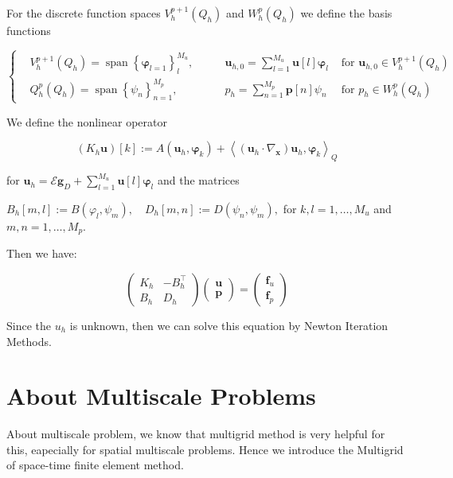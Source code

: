 For the discrete function spaces  $V_{h}^{p+1}\left(Q_h\right)$  and  $W_{h}^{p}\left(Q_h\right)$  we define the basis functions

$$\left\{\begin{aligned}
&V_{h}^{p+1}\left(Q_h\right)=\operatorname{span}\left\{\boldsymbol{\varphi}_{l=1}\right\}_{l}^{M_{u}}, \qquad& \boldsymbol{u}_{h, 0}=\sum_{l=1}^{M_{u}} \boldsymbol{u}[l] \boldsymbol{\varphi}_{l} & \text { for } \boldsymbol{u}_{h, 0} \in V_{h}^{p+1}\left(Q_h\right) \\
&Q_{h}^{p}\left(Q_h\right)=\operatorname{span}\left\{\psi_{n}\right\}_{n=1}^{M_{p}}, \qquad & p_{h}=\sum_{n=1}^{M_{p}} \boldsymbol{p}[n] \psi_{n} & \text { for } p_{h} \in W_{h}^{p}\left(Q_h\right)
\end{aligned}\right.$$

We define the nonlinear operator

$$\left(K_{h} \boldsymbol{u}\right)[k]:=A\left(\boldsymbol{u}_{h}, \boldsymbol{\varphi}_{k}\right)+\left\langle\left(\boldsymbol{u}_{h} \cdot \nabla_{\boldsymbol{x}}\right) \boldsymbol{u}_{h}, \boldsymbol{\varphi}_{k}\right\rangle_{Q}$$

for  $\boldsymbol{u}_{h}=\mathcal{E} \boldsymbol{g}_{D}+\sum_{l=1}^{M_{u}} \boldsymbol{u}[l] \boldsymbol{\varphi}_{l}$  and the matrices

$B_{h}[m, l]:=B\left(\varphi_{l}, \psi_{m}\right), \quad D_{h}[m, n]:=D\left(\psi_{n}, \psi_{m}\right),$
for  $k, l=1, \ldots, M_{u}$  and  $m, n=1, \ldots, M_{p}$. 

Then we have:

$$\left(\begin{array}{cc}
K_{h} & -B_{h}^{\top} \\
B_{h} & D_{h}
\end{array}\right)\left(\begin{array}{l}
\boldsymbol{u} \\
\boldsymbol{p}
\end{array}\right)=\left(\begin{array}{l}
\boldsymbol{f}_{u} \\
\boldsymbol{f}_{p}
\end{array}\right)$$

Since the $u_h$ is unknown, then we can solve this equation by Newton Iteration Methods.

\section{About Multiscale Problems}
About multiscale problem, we know that multigrid method is very helpful for this, eapecially for spatial multiscale problems. 
Hence we introduce the Multigrid of space-time finite element method.

